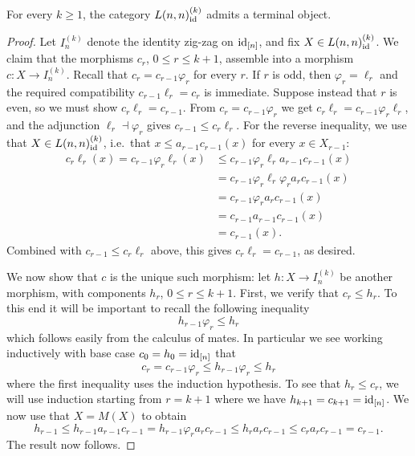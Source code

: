\documentclass[a4paper,reqno,twoside]{amsart}
\begin{document}
\begin{proposition}\label{prop:Qcontract}
	For every $k \geq 1$, the category $L(n,n)_{\mathrm{id}}^{(k)}$ admits a terminal object.
\end{proposition}
\begin{proof}
	
	Let $I_n^{(k)}$ denote the identity zig-zag on $\mathrm{id}_{[n]}$, and fix $X \in L(n,n)_{\mathrm{id}}^{(k)}$. We claim that the morphisms $c_r$, $0\leq r \leq k+1$, assemble into a morphism $c \colon X \to I_n^{(k)}$. Recall that $c_r=c_{r-1}\varphi_r$ for every $r$. If $r$ is odd, then $\varphi_r=\ell_r$ and the required compatibility $c_{r-1}\ell_r=c_r$ is immediate. Suppose instead that $r$ is even, so we must show $c_r\ell_r=c_{r-1}$. From $c_r=c_{r-1}\varphi_r$ we get $c_r\ell_r=c_{r-1}\varphi_r\ell_r$, and the adjunction $\ell_r \dashv \varphi_r$ gives $c_{r-1} \leq c_r \ell_r$. For the reverse inequality, we use that $X \in L(n,n)_{\mathrm{id}}^{(k)}$, i.e.\ that $x \leq a_{r-1}c_{r-1}(x)$ for every $x \in X_{r-1}$:
	\[
		\begin{aligned}
			c_r \ell_r(x) = c_{r-1}\varphi_{r} \ell_r(x)
			&\leq c_{r-1}\varphi_{r} \ell_r a_{r-1}c_{r-1}(x) \\
			&= c_{r-1}\varphi_{r} \ell_r \varphi_r a_{r}c_{r-1}(x) \\
			&= c_{r-1}\varphi_r a_r c_{r-1}(x) \\
			&= c_{r-1}a_{r-1}c_{r-1}(x) \\
			&= c_{r-1}(x).
		\end{aligned}
	\]
	Combined with $c_{r-1} \leq c_r\ell_r$ above, this gives $c_r\ell_r=c_{r-1}$, as desired.

	We now show that $c$ is the unique such morphism: let $h \colon X \to I_n^{(k)}$ be another morphism, with components $h_r$, $0 \leq r \leq k+1$. First, we verify that $c_r \leq h_r $. To this end it will be important to recall the following inequality
	\begin{equation}
		h_{r-1}\varphi_r \leq h_r
	\end{equation}
	which follows easily from the calculus of mates. In particular we see working inductively with base case $c_0=h_0=\mathrm{id}_{[n]}$ that 
	\[
		c_{r}= c_{r-1}\varphi_r \leq h_{r-1}\varphi_r \leq h_r
	\]
	where the first inequality uses the induction hypothesis.
	To see that $ h_r \leq c_r$, we will use induction starting from $r=k+1$ where we have $h_{k+1}=c_{k+1}=\mathrm{id}_{[n]}$. We now use that $X=M(X)$ to obtain
	\[
		h_{r-1} \leq h_{r-1} a_{r-1} c_{r-1} = h_{r-1} \varphi_r a_{r}c_{r-1} \leq  h_r a_{r} c_{r-1} \leq c_r a_{r}c_{r-1}=c_{r-1}.
	\]
	The result now follows.
\end{proof}
\end{document}
